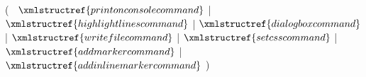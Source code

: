 ( 
$~$ $\xmlstructref{printonconsolecommand}$ 
| $\xmlstructref{highlightlinescommand}$ 
| $\xmlstructref{dialogboxcommand}$ 
| $\xmlstructref{writefilecommand}$ 
| $\xmlstructref{setcsscommand}$
| $\xmlstructref{addmarkercommand}$
| $\xmlstructref{addinlinemarkercommand}$
)
